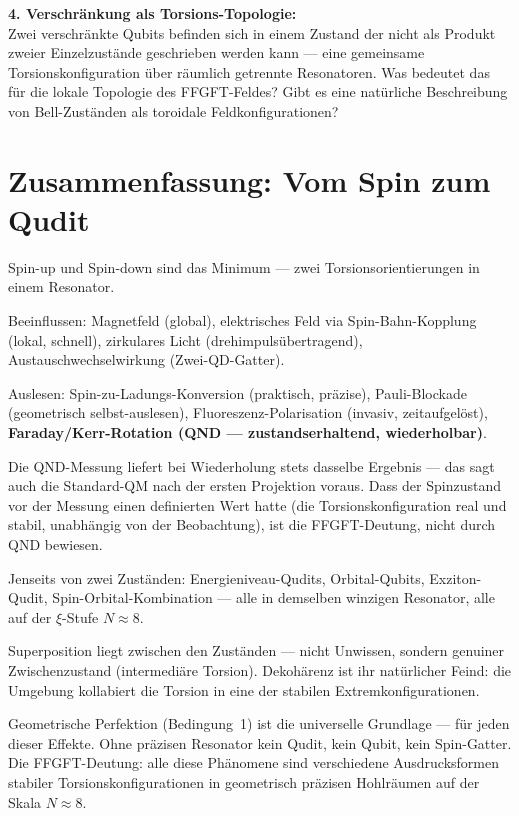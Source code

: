 \begin{significance}
\textbf{4. Verschränkung als Torsions-Topologie:}\\
Zwei verschränkte Qubits befinden sich in einem Zustand
der nicht als Produkt zweier Einzelzustände geschrieben
werden kann --- eine gemeinsame Torsionskonfiguration
über räumlich getrennte Resonatoren.
Was bedeutet das für die lokale Topologie
des FFGFT-Feldes?
Gibt es eine natürliche Beschreibung von Bell-Zuständen
als toroidale Feldkonfigurationen?
\end{significance}

\section{Zusammenfassung: Vom Spin zum Qudit}
\label{sec:zusammenfassung-174}

\begin{conclusionBox}[Fazit]
Spin-up und Spin-down sind das Minimum ---
zwei Torsionsorientierungen in einem Resonator.

Beeinflussen: Magnetfeld (global), elektrisches Feld
via Spin-Bahn-Kopplung (lokal, schnell), zirkulares Licht
(drehimpulsübertragend), Austauschwechselwirkung (Zwei-QD-Gatter).

Auslesen: Spin-zu-Ladungs-Konversion (praktisch, präzise),
Pauli-Blockade (geometrisch selbst-auslesen),
Fluoreszenz-Polarisation (invasiv, zeitaufgelöst),
\textbf{Faraday/Kerr-Rotation (QND --- zustandserhaltend, wiederholbar)}.

Die QND-Messung liefert bei Wiederholung stets dasselbe Ergebnis ---
das sagt auch die Standard-QM nach der ersten Projektion voraus.
Dass der Spinzustand vor der Messung einen definierten Wert hatte
(die Torsionskonfiguration real und stabil, unabhängig von der
Beobachtung), ist die FFGFT-Deutung, nicht durch QND bewiesen.

Jenseits von zwei Zuständen:
Energieniveau-Qudits, Orbital-Qubits, Exziton-Qudit,
Spin-Orbital-Kombination --- alle in demselben
winzigen Resonator, alle auf der $\xi$-Stufe $N \approx 8$.

Superposition liegt zwischen den Zuständen ---
nicht Unwissen, sondern genuiner Zwischenzustand
(intermediäre Torsion).
Dekohärenz ist ihr natürlicher Feind:
die Umgebung kollabiert die Torsion in eine der
stabilen Extremkonfigurationen.

Geometrische Perfektion (Bedingung~1) ist
die universelle Grundlage --- für jeden dieser Effekte.
Ohne präzisen Resonator kein Qudit, kein Qubit,
kein Spin-Gatter. Die FFGFT-Deutung:
alle diese Phänomene sind verschiedene Ausdrucksformen
stabiler Torsionskonfigurationen in geometrisch
präzisen Hohlräumen auf der Skala $N \approx 8$.
\end{conclusionBox}

